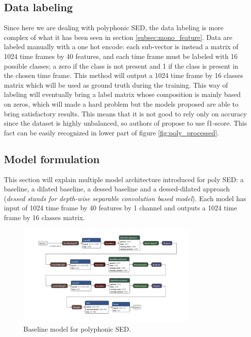 \documentclass{article}
\begin{document}
\subsection{Data labeling}
\label{subsec:poly_label}

Since here we are dealing with polyphonic SED, the data labeling is more complex of what it has been seen in section \ref{subsec:mono_feature}. Data are labeled manually with a one hot encode: each sub-vector is instead a matrix of 1024 time frames by 40 features, and each time frame must be labeled with 16 possible classes; a zero if the class is not present and 1 if the class is present in the chosen time frame. This method will output a 1024 time frame by 16 classes matrix which will be used as ground truth during the training. This way of labeling will eventually bring a label matrix whose composition is mainly based on zeros, which will made a hard problem but the models proposed are able to bring satisfactory results. This means that it is not good to rely only on accuracy since the dataset is highly unbalanced, so authors of \cite{drossos2020sound} propose to use f1-score. This fact can be easily recognized in lower part of figure \ref{fig:poly_processed}.

\subsection{Model formulation}
\label{subsec:poly_model}

This section will explain multiple model architecture introduced for poly SED: a baseline, a dilated baseline, a dessed baseline and a dessed-dilated approach (\textit{dessed stands for depth-wise separable convolution based model}). Each model has input of 1024 time frame by 40 features by 1 channel and outputs a 1024 time frame by 16 classes matrix.

\begin{figure}[H]
	\centering
	\includegraphics[width=0.8\textwidth]{./images/poly/baseline.png}	
	\caption{Baseline model for polyphonic SED.}
	\label{fig:poly_baseline}
\end{figure}
\end{document}
